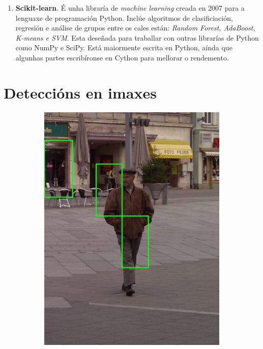 \documentclass[galician]{./head/uvigo-tfg}
\begin{document}
\begin{enumerate}
        \item \textbf{Scikit-learn}\cite{scikit-learn}. É unha libraría de \textit{machine learning} creada en 2007 para a lenguaxe de programación Python. Inclúe algoritmos de clasificiación, regresión e análise de grupos entre os cales están: \textit{Random Forest, AdaBoost, K-means e SVM}. Esta deseñada para traballar con outras librarías de Python como NumPy e SciPy. Está maiormente escrita en Python, aínda que algunhas partes escribíronse en Cython para mellorar o rendemento.
    \end{enumerate}
\newpage
\section{Deteccións en imaxes}\label{images}
        \begin{figure}[h]
        \centering
        \begin{subfigure}{.3\textwidth}
          \centering
            \includegraphics[width=0.8\linewidth]{figures/person1.jpg}
          \label{fig:person1}
        \end{subfigure}%
        \begin{subfigure}{.5\textwidth}
          \centering

\end{subfigure}
\end{figure}
\end{document}
